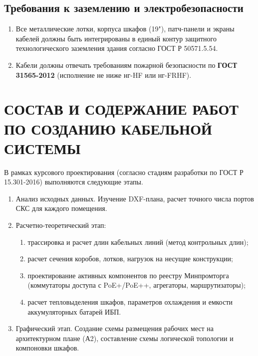 \documentclass[a4paper,oneside,14pt]{extreport}
\begin{document}
\section{Требования к заземлению и электробезопасности}
\begin{enumerate}[label=\thesection.\arabic*]
    \item Все металлические лотки, корпуса шкафов (19"), патч-панели и экраны кабелей должны быть интегрированы в единый контур защитного технологического заземления здания согласно ГОСТ Р 50571.5.54.
    \item Кабели должны отвечать требованиям пожарной безопасности по \textbf{ГОСТ 31565-2012} (исполнение не ниже нг-HF или нг-FRHF).
\end{enumerate}


\chapter{СОСТАВ И СОДЕРЖАНИЕ РАБОТ ПО СОЗДАНИЮ КАБЕЛЬНОЙ СИСТЕМЫ}
В рамках курсового проектирования (согласно стадиям разработки по ГОСТ Р 15.301-2016) выполняются следующие этапы.
\begin{enumerate}[label=\thechapter.\arabic*]
    \item Анализ исходных данных. Изучение DXF-плана, расчет точного числа портов СКС для каждого помещения.
    \item Расчетно-теоретический этап:
    \begin{enumerate}[label=\asbuk*)]
        \item трассировка и расчет длин кабельных линий (метод контрольных длин);
        \item расчет сечения коробов, лотков, нагрузок на несущие конструкции;
        \item проектирование активных компонентов по реестру Минпромторга (коммутаторы доступа с PoE+/PoE++, агрегаторы, маршрутизаторы);
        \item расчет тепловыделения шкафов, параметров охлаждения и емкости аккумуляторных батарей ИБП.
    \end{enumerate}
    \item Графический этап. Создание схемы размещения рабочих мест на архитектурном плане (А2), составление схемы логической топологии и компоновки шкафов.
\end{enumerate}
\end{document}

